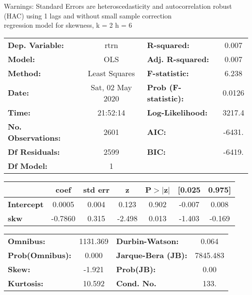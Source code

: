 Warnings: \newline
 [1] Standard Errors are heteroscedasticity and autocorrelation robust (HAC) using 1 lags and without small sample correction\\ 

regression model for skewness, k = 2 h = 6\begin{center}
\begin{tabular}{lclc}
\toprule
\textbf{Dep. Variable:}    &       rtrn       & \textbf{  R-squared:         } &     0.007   \\
\textbf{Model:}            &       OLS        & \textbf{  Adj. R-squared:    } &     0.007   \\
\textbf{Method:}           &  Least Squares   & \textbf{  F-statistic:       } &     6.238   \\
\textbf{Date:}             & Sat, 02 May 2020 & \textbf{  Prob (F-statistic):} &   0.0126    \\
\textbf{Time:}             &     21:52:14     & \textbf{  Log-Likelihood:    } &    3217.4   \\
\textbf{No. Observations:} &        2601      & \textbf{  AIC:               } &    -6431.   \\
\textbf{Df Residuals:}     &        2599      & \textbf{  BIC:               } &    -6419.   \\
\textbf{Df Model:}         &           1      & \textbf{                     } &             \\
\bottomrule
\end{tabular}
\begin{tabular}{lcccccc}
                   & \textbf{coef} & \textbf{std err} & \textbf{z} & \textbf{P$> |$z$|$} & \textbf{[0.025} & \textbf{0.975]}  \\
\midrule
\textbf{Intercept} &       0.0005  &        0.004     &     0.123  &         0.902        &       -0.007    &        0.008     \\
\textbf{skw}       &      -0.7860  &        0.315     &    -2.498  &         0.013        &       -1.403    &       -0.169     \\
\bottomrule
\end{tabular}
\begin{tabular}{lclc}
\textbf{Omnibus:}       & 1131.369 & \textbf{  Durbin-Watson:     } &    0.064  \\
\textbf{Prob(Omnibus):} &   0.000  & \textbf{  Jarque-Bera (JB):  } & 7845.483  \\
\textbf{Skew:}          &  -1.921  & \textbf{  Prob(JB):          } &     0.00  \\
\textbf{Kurtosis:}      &  10.592  & \textbf{  Cond. No.          } &     133.  \\
\bottomrule
\end{tabular}
\end{center}

